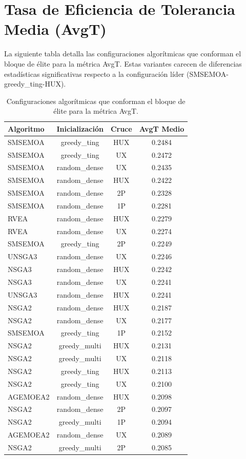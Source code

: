 \section{Tasa de Eficiencia de Tolerancia Media (AvgT)}\label{anexo:elite_avgt}

La siguiente tabla detalla las configuraciones algorítmicas que conforman el bloque de élite para la métrica AvgT. Estas variantes carecen de diferencias estadísticas significativas respecto a la configuración líder (SMSEMOA-greedy\_ting-HUX).

\begin{table}[H]
    \centering
    \begin{tabular}{lccc}
        \toprule
        \textbf{Algoritmo} & \textbf{Inicialización} & \textbf{Cruce} & \textbf{AvgT Medio} \\
        \midrule
        SMSEMOA & greedy\_ting & HUX & 0.2484 \\
        SMSEMOA & greedy\_ting & UX & 0.2472 \\
        SMSEMOA & random\_dense & UX & 0.2435 \\
        SMSEMOA & random\_dense & HUX & 0.2422 \\
        SMSEMOA & random\_dense & 2P & 0.2328 \\
        SMSEMOA & random\_dense & 1P & 0.2281 \\
        RVEA & random\_dense & HUX & 0.2279 \\
        RVEA & random\_dense & UX & 0.2274 \\
        SMSEMOA & greedy\_ting & 2P & 0.2249 \\
        UNSGA3 & random\_dense & UX & 0.2246 \\
        NSGA3 & random\_dense & HUX & 0.2242 \\
        NSGA3 & random\_dense & UX & 0.2241 \\
        UNSGA3 & random\_dense & HUX & 0.2241 \\
        NSGA2 & random\_dense & HUX & 0.2187 \\
        NSGA2 & random\_dense & UX & 0.2177 \\
        SMSEMOA & greedy\_ting & 1P & 0.2152 \\
        NSGA2 & greedy\_multi & HUX & 0.2131 \\
        NSGA2 & greedy\_multi & UX & 0.2118 \\
        NSGA2 & greedy\_ting & HUX & 0.2113 \\
        NSGA2 & greedy\_ting & UX & 0.2100 \\
        AGEMOEA2 & random\_dense & HUX & 0.2098 \\
        NSGA2 & random\_dense & 2P & 0.2097 \\
        NSGA2 & greedy\_multi & 1P & 0.2094 \\
        AGEMOEA2 & random\_dense & UX & 0.2089 \\
        NSGA2 & greedy\_multi & 2P & 0.2085 \\
        \bottomrule
    \end{tabular}
    \caption[Bloque de élite de AvgT]{Configuraciones algorítmicas que conforman el bloque de élite para la métrica AvgT.}
    \label{tab:elite_avgt}
\end{table}
